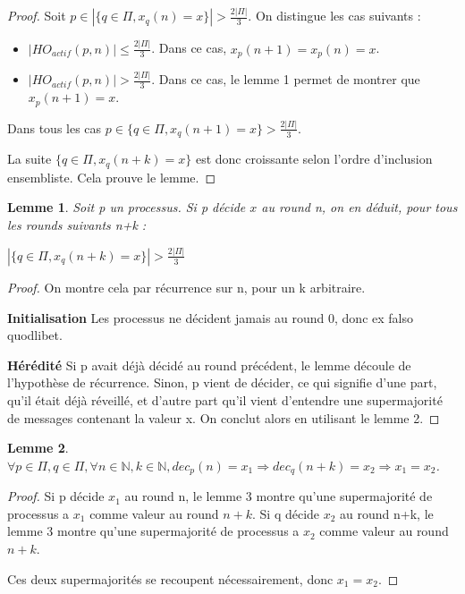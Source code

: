 \documentclass{article}
\newtheorem{lemma}{Lemme}
\begin{document}
\begin{proof}

Soit $p \in | \{ q \in \Pi , x_q(n) = x \} | > \frac{2|\Pi|}{3}$. On distingue les cas suivants :

\begin{itemize}

\item $|HO_{actif} (p, n) | \leq \frac{2|\Pi|}{3}$. Dans ce cas, $x_p(n+1) = x_p(n) = x$.
\item $|HO_{actif} (p, n) | > \frac{2|\Pi|}{3}$. Dans ce cas, le lemme 1 permet de montrer que $x_p(n+1) = x$.

\end{itemize}
Dans tous les cas 
$p \in \{ q \in \Pi , x_q(n+1) = x \} > \frac{2|\Pi|}{3}$.

La suite $\{ q \in \Pi , x_q(n+k) = x \}$ est donc croissante selon l'ordre d'inclusion ensembliste. Cela prouve le lemme.
\end{proof}
\begin{lemma}

Soit p un processus. Si p décide $x$ au round n, on en déduit, pour tous les rounds suivants n+k :

$| \{ q \in \Pi , x_q(n+k) = x \} | > \frac{2|\Pi|}{3}$
\end{lemma}
\begin{proof}

On montre cela par récurrence sur n, pour un k arbitraire.

\textbf{Initialisation}
Les processus ne décident jamais au round 0, donc ex falso quodlibet.

\textbf{Hérédité}
Si p avait déjà décidé au round précédent, le lemme découle de l'hypothèse de récurrence.
Sinon, p vient de décider, ce qui signifie d'une part, qu'il était déjà réveillé, et d'autre part
qu'il vient d'entendre une supermajorité de messages contenant la valeur x.
On conclut alors en utilisant le lemme 2.

\end{proof}
\begin{lemma}
	$\forall p \in \Pi, q \in \Pi, \forall n \in \mathds{N}, k \in \mathds{N}, dec_p(n) = x_1 \Rightarrow dec_q(n+k) = x_2 \Rightarrow x_1 = x_2$.
\end{lemma}
\begin{proof}

Si p décide $x_1$ au round n,   le lemme 3 montre qu'une supermajorité de processus a $x_1$ comme valeur au round $n+k$.
Si q décide $x_2$ au round n+k, le lemme 3 montre qu'une supermajorité de processus a $x_2$ comme valeur au round $n+k$.

Ces deux supermajorités se recoupent nécessairement, donc $x_1 = x_2$.
\end{proof}
\end{document}
